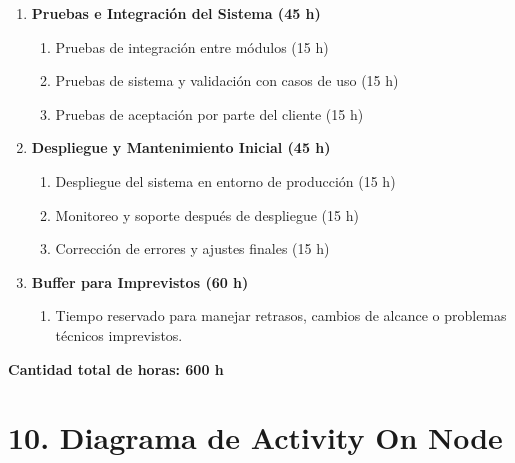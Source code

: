 \documentclass[
11pt, %
]{charter}
\begin{document}
\begin{enumerate}
\begin{enumerate}
\end{enumerate}
\item \textbf{Pruebas e Integración del Sistema (45 h)}
\begin{enumerate}
\item Pruebas de integración entre módulos (15 h)
\item Pruebas de sistema y validación con casos de uso (15 h)
\item Pruebas de aceptación por parte del cliente (15 h)
\end{enumerate}
\item \textbf{Despliegue y Mantenimiento Inicial (45 h)}
\begin{enumerate}
\item Despliegue del sistema en entorno de producción (15 h)
\item Monitoreo y soporte después de despliegue (15 h)
\item Corrección de errores y ajustes finales (15 h)
\end{enumerate}
\item \textbf{Buffer para Imprevistos (60 h)}
\begin{enumerate}
\item Tiempo reservado para manejar retrasos, cambios de alcance o problemas técnicos imprevistos.
\end{enumerate}
\end{enumerate}

\textbf{Cantidad total de horas: 600 h}


\section{10. Diagrama de Activity On Node}
\label{sec:AoN}
\end{document}
